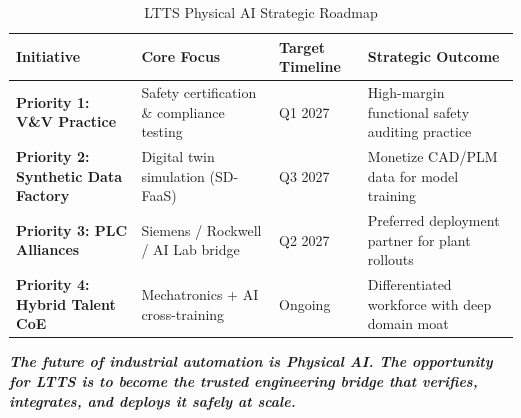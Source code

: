 \documentclass[11pt,a4paper]{article}
\begin{document}
\begin{table}[h!]
\centering
\small
\begin{tabularx}{\textwidth}{@{}l p{4.5cm} l X@{}}
\toprule
\textbf{Initiative} & \textbf{Core Focus} & \textbf{Target Timeline} & \textbf{Strategic Outcome} \\
\midrule
\textbf{Priority 1: V\&V Practice} & Safety certification \& compliance testing & Q1 2027 & High-margin functional safety auditing practice \\
\textbf{Priority 2: Synthetic Data Factory} & Digital twin simulation (SD-FaaS) & Q3 2027 & Monetize CAD/PLM data for model training \\
\textbf{Priority 3: PLC Alliances} & Siemens / Rockwell / AI Lab bridge & Q2 2027 & Preferred deployment partner for plant rollouts \\
\textbf{Priority 4: Hybrid Talent CoE} & Mechatronics + AI cross-training & Ongoing & Differentiated workforce with deep domain moat \\
\bottomrule
\end{tabularx}
\caption{LTTS Physical AI Strategic Roadmap}
\end{table}

\vspace{0.4cm}
\begin{center}
\small\color{textdark}\textbf{\textit{The future of industrial automation is Physical AI. The opportunity for LTTS is to become the trusted engineering bridge that verifies, integrates, and deploys it safely at scale.}}
\end{center}
\end{document}
